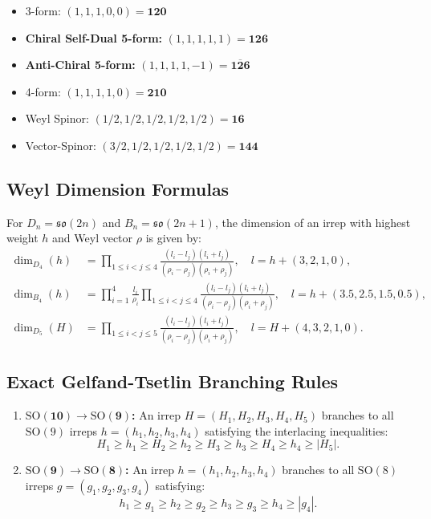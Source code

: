 \documentclass[11pt,a4paper]{article}
\begin{document}
\begin{enumerate}
\begin{itemize}
        \item 3-form: $(1, 1, 1, 0, 0) = \mathbf{120}$
        \item \textbf{Chiral Self-Dual 5-form:} $(1, 1, 1, 1, 1) = \mathbf{126}$
        \item \textbf{Anti-Chiral 5-form:} $(1, 1, 1, 1, -1) = \mathbf{\overline{126}}$
        \item 4-form: $(1, 1, 1, 1, 0) = \mathbf{210}$
        \item Weyl Spinor: $(1/2, 1/2, 1/2, 1/2, 1/2) = \mathbf{16}$
        \item Vector-Spinor: $(3/2, 1/2, 1/2, 1/2, 1/2) = \mathbf{144}$
    \end{itemize}
\end{enumerate}

\subsection{Weyl Dimension Formulas}
For $D_n = \mathfrak{so}(2n)$ and $B_n = \mathfrak{so}(2n+1)$, the dimension of an irrep with highest weight $h$ and Weyl vector $\rho$ is given by:
\begin{align}
    \dim_{D_4}(h) &= \prod_{1 \le i < j \le 4} \frac{(l_i - l_j)(l_i + l_j)}{(\rho_i - \rho_j)(\rho_i + \rho_j)}, \quad l = h + (3, 2, 1, 0), \\
    \dim_{B_4}(h) &= \prod_{i=1}^4 \frac{l_i}{\rho_i} \prod_{1 \le i < j \le 4} \frac{(l_i - l_j)(l_i + l_j)}{(\rho_i - \rho_j)(\rho_i + \rho_j)}, \quad l = h + (3.5, 2.5, 1.5, 0.5), \\
    \dim_{D_5}(H) &= \prod_{1 \le i < j \le 5} \frac{(l_i - l_j)(l_i + l_j)}{(\rho_i - \rho_j)(\rho_i + \rho_j)}, \quad l = H + (4, 3, 2, 1, 0).
\end{align}

\subsection{Exact Gelfand-Tsetlin Branching Rules}
\begin{enumerate}
    \item \textbf{$\bm{\mathrm{SO}(10) \to \mathrm{SO}(9)}$:} An irrep $H = (H_1, H_2, H_3, H_4, H_5)$ branches to all $\mathrm{SO}(9)$ irreps $h = (h_1, h_2, h_3, h_4)$ satisfying the interlacing inequalities:
    \begin{equation}
        H_1 \ge h_1 \ge H_2 \ge h_2 \ge H_3 \ge h_3 \ge H_4 \ge h_4 \ge |H_5|.
        \label{eq:so10_to_so9_gt}
    \end{equation}
    \item \textbf{$\bm{\mathrm{SO}(9) \to \mathrm{SO}(8)}$:} An irrep $h = (h_1, h_2, h_3, h_4)$ branches to all $\mathrm{SO}(8)$ irreps $g = (g_1, g_2, g_3, g_4)$ satisfying:
    \begin{equation}
        h_1 \ge g_1 \ge h_2 \ge g_2 \ge h_3 \ge g_3 \ge h_4 \ge |g_4|.
        \label{eq:so9_to_so8_gt}
    \end{equation}
\end{enumerate}
\end{document}
